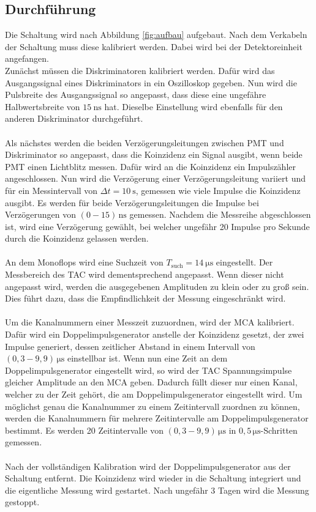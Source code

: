 \subsection{Durchführung}
Die Schaltung wird nach Abbildung \ref{fig:aufbau} aufgebaut.
Nach dem Verkabeln der Schaltung muss diese kalibriert werden.
Dabei wird bei der Detektoreinheit angefangen.\\
Zunächst müssen die Diskriminatoren kalibriert werden.
Dafür wird das Ausgangssignal eines Diskriminators in ein Oszilloskop gegeben.
Nun wird die Pulsbreite des Ausgangssignal so angepasst, dass diese eine ungefähre Halbwertsbreite von $\SI{15}{\nano\second}$ hat.
Dieselbe Einstellung wird ebenfalls für den anderen Diskriminator durchgeführt.\\\\
Als nächstes werden die beiden Verzögerungsleitungen zwischen PMT und Diskriminator so angepasst, dass die Koinzidenz ein Signal ausgibt, wenn beide PMT einen Lichtblitz messen.
Dafür wird an die Koinzidenz ein Impulszähler angeschlossen.
Nun wird die Verzögerung einer Verzögerungsleitung variiert und für ein Messintervall von $\Delta t = \SI{10}{\second}$, gemessen wie viele Impulse die Koinzidenz ausgibt.
Es werden für beide Verzögerungsleitungen die Impulse bei Verzögerungen von $(0-15)\,\si{\nano\second}$ gemessen.
Nachdem die Messreihe abgeschlossen ist, wird eine Verzögerung gewählt, bei welcher ungefähr 20 Impulse pro Sekunde durch die Koinzidenz gelassen werden.\\\\
An dem Monoflops wird eine Suchzeit von $T_\text{such} = \SI{14}{\micro\second}$ eingestellt.
Der Messbereich des TAC wird dementsprechend angepasst.
Wenn dieser nicht angepasst wird, werden die ausgegebenen Amplituden zu klein oder zu groß sein.
Dies führt dazu, dass die Empfindlichkeit der Messung eingeschränkt wird.\\\\
Um die Kanalnummern einer Messzeit zuzuordnen, wird der MCA kalibriert.
Dafür wird ein Doppelimpulsgenerator anstelle der Koinzidenz gesetzt, der zwei Impulse generiert, dessen zeitlicher Abstand in einem Intervall von $(0,3-9,9)\,\si{\micro\second}$ einstellbar ist.
Wenn nun eine Zeit an dem Doppelimpulsgenerator eingestellt wird, so wird der TAC Spannungsimpulse gleicher Amplitude an den MCA geben.
Dadurch füllt dieser nur einen Kanal, welcher zu der Zeit gehört, die am Doppelimpulsgenerator eingestellt wird.
Um möglichst genau die Kanalnummer zu einem Zeitintervall zuordnen zu können, werden die Kanalnummern für mehrere Zeitintervalle am Doppelimpulsgenerator bestimmt.
Es werden 20 Zeitintervalle von $(0,3-9,9)\,\si{\micro\second}$ in $0,5\,\si{\micro\second}$-Schritten gemessen.\\\\
Nach der vollständigen Kalibration wird der Doppelimpulsgenerator aus der Schaltung entfernt.
Die Koinzidenz wird wieder in die Schaltung integriert und die eigentliche Messung wird gestartet.
Nach ungefähr 3 Tagen wird die Messung gestoppt.